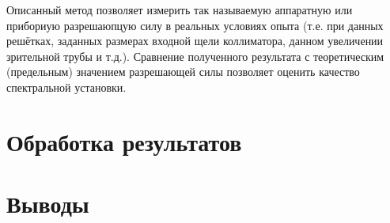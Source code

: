 \documentclass[a4paper, 12pt]{article}
\begin{document}
Описанный метод позволяет измерить так называемую аппаратную или прибориую разрешаюпцую силу в реальных условиях опыта (т.е. при данных решётках, заданных размерах входной щели коллиматора, данном увеличении зрительной трубы и т.д.). Сравнение полученного результата с теоретическим (предельным) значением разрешающей силы позволяет оценить качество спектральной установки.
\section{Обработка результатов}

\section{Выводы}
\end{document}

